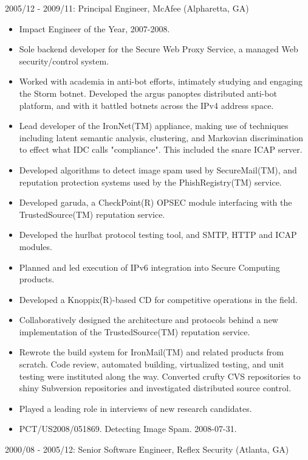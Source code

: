 \documentclass{article}
\begin{document}
2005/12 - 2009/11: Principal Engineer, McAfee (Alpharetta, GA)

\begin{itemize}
\item Impact Engineer of the Year, 2007-2008.
\item Sole backend developer for the Secure Web Proxy Service, a managed Web
  security/control system.
\item Worked with academia in anti-bot efforts, intimately studying and engaging
  the Storm botnet. Developed the argus panoptes distributed anti-bot
  platform, and with it battled botnets across the IPv4 address space.
\item Lead developer of the IronNet(TM) appliance, making use of techniques
  including latent semantic analysis, clustering, and Markovian discrimination
  to effect what IDC calls "compliance". This included the snare ICAP server.
\item Developed algorithms to detect image spam used by SecureMail(TM), and
  reputation protection systems used by the PhishRegistry(TM) service.
\item Developed garuda, a CheckPoint(R) OPSEC module interfacing with the
  TrustedSource(TM) reputation service.
\item Developed the hurlbat protocol testing tool, and SMTP, HTTP and ICAP modules.
\item Planned and led execution of IPv6 integration into Secure Computing products.
\item Developed a Knoppix(R)-based CD for competitive operations in the field.
\item Collaboratively designed the architecture and protocols behind a new
  implementation of the TrustedSource(TM) reputation service.
\item Rewrote the build system for IronMail(TM) and related products from scratch.
  Code review, automated building, virtualized testing, and unit testing were
  instituted along the way. Converted crufty CVS repositories to shiny
  Subversion repositories and investigated distributed source control.
\item Played a leading role in interviews of new research candidates.
\item PCT/US2008/051869. Detecting Image Spam. 2008-07-31.
\end{itemize}

2000/08 - 2005/12: Senior Software Engineer, Reflex Security (Atlanta, GA)
\end{document}
